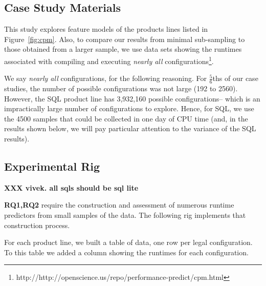 \documentclass{sig-alternative}
\newcommand{\fig}[1]{Figure~\ref{fig:#1}}
\begin{document}
\subsection{Case Study Materials}

This study explores feature models of the products lines listed in \fig{cpm}.
Also, to compare our results from minimal sub-sampling to those obtained 
from a larger sample, we use data sets showing the runtimes associated with
compiling and executing {\em nearly all} configurations\footnote{http://http://openscience.us/repo/performance-predict/cpm.html}.

We say {\em nearly all} configurations, for the following reasoning. For 
$\frac{5}{6}$ths of our case studies, the number of possible configurations
was not large (192 to 2560). However, the SQL product line has 3,932,160 
possible configurations-- which is an impractically large number of configurations to explore. Hence, for SQL, we use the 4500 samples that could
be collected in one day of CPU time (and, in the results shown below,
we will pay particular attention to the variance of the SQL results).

\subsection{Experimental Rig}

{\bf XXX vivek. all sqls should be sql lite}


 



{\bf RQ1,RQ2} require the construction and assessment of numerous runtime predictors from small samples
of the data. The following rig implements that construction process.

For each product line, we built a table of data, one row per legal configuration.
To this table we added a column showing the runtimes for each configuration.
\end{document}
